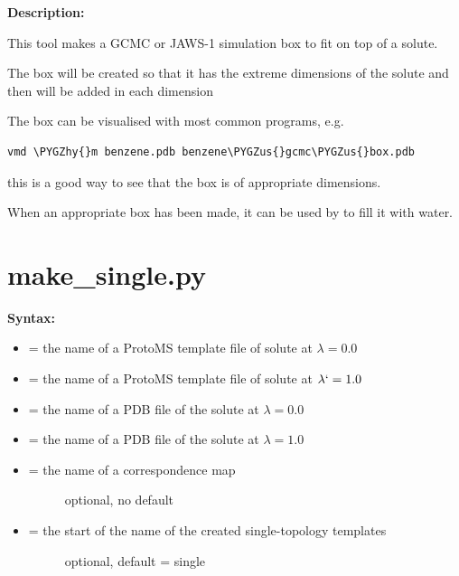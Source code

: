 \documentclass[letterpaper,10pt,english]{sphinxmanual}
\def\PYGZus{\char`\_}
\def\PYGZhy{\char`\-}
\begin{document}
\textbf{Description:}

This tool makes a GCMC or JAWS-1 simulation box to fit on top of a solute.

The box will be created so that it has the extreme dimensions of the solute and then  will be added in each dimension

The box can be visualised with most common programs, e.g.

\begin{Verbatim}[frame=single,commandchars=\\\{\}]
vmd \PYGZhy{}m benzene.pdb benzene\PYGZus{}gcmc\PYGZus{}box.pdb
\end{Verbatim}

this is a good way to see that the box is of appropriate dimensions.

When an appropriate box has been made, it can be used by  to fill it with water.


\section{make\_single.py}
\label{tools:make-single-py}
\textbf{Syntax:}

\begin{itemize}
\item {} 
 = the name of a ProtoMS template file of solute at \(\lambda=0.0\)

\item {} 
 = the name of a ProtoMS template file of solute at \(\lambda`=1.0\)

\item {} 
 = the name of a PDB file of the solute at \(\lambda=0.0\)

\item {} 
 = the name of a PDB file of the solute at \(\lambda=1.0\)

\item {} \begin{description}
\item[{ = the name of a correspondence map}] \leavevmode
optional, no default

\end{description}

\item {} \begin{description}
\item[{ = the start of the name of the created single-topology templates}] \leavevmode
optional, default = single

\end{description}

\end{itemize}
\end{document}
